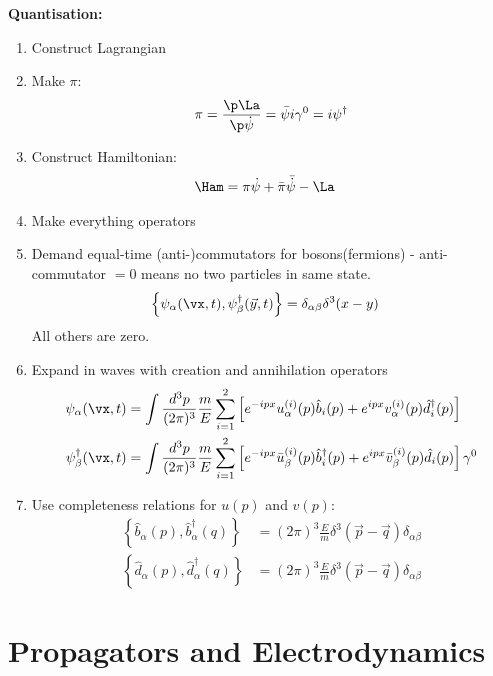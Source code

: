 \documentclass[a4paper, 11pt, normalem]{report}
\begin{document}
\newpage
\textbf{Quantisation:}
\begin{enumerate}
    \item Construct Lagrangian
    \item Make $\pi$:
        \begin{equation}
            \pi = \frac{\p\La}{\p\dot{\psi}} = \bar{\psi}i\gamma^0 = i\psi^\dagger
        \end{equation}
    \item Construct Hamiltonian:
        \begin{align}
            \Ham &= \pi\dot{\psi} + \bar{\pi}\bar{\dot{\psi}} - \La
        \end{align}
    \item Make everything operators
    \item Demand equal-time (anti-)commutators for bosons(fermions) - anti-commutator $= 0$ means no two particles in same state.
        \begin{align}
            \left\{\psi_\alpha(\vx,t),\psi^\dagger_\beta(\vec{y},t)\right\} &= \delta_{\alpha\beta}\delta^3(x-y)
        \end{align}
        All others are zero.
    \item Expand in waves with creation and annihilation operators
        \begin{align}
            \psi_\alpha(\vx,t) &= \int \frac{d^3p}{(2\pi)^3} \frac{m}{E} \sum_{i=1}^2\left[e^{-ipx}u_\alpha^{(i)}(p)\hat{b}_i(p) + e^{ipx}v_\alpha^{(i)}(p)\hat{d}^\dagger_i(p) \right]\\
            \psi_\beta^\dagger(\vx,t) &= \int \frac{d^3p}{(2\pi)^3} \frac{m}{E} \sum_{i=1}^2\left[e^{-ipx}\bar{u}_\beta^{(i)}(p)\hat{b}^\dagger_i(p) + e^{ipx}\bar{v}_\beta^{(i)}(p)\hat{d}_i(p) \right]\gamma^0
        \end{align}
    \item Use completeness relations for $u(p)$ and $v(p)$:
        \begin{align}
            \left\{\hat{b}_\alpha(p),\hat{b}_\alpha^\dagger(q)\right\} &= (2\pi)^3\frac{E}{m}\delta^3(\vec{p}-\vec{q})\delta_{\alpha\beta} \\
            \left\{\hat{d}_\alpha(p),\hat{d}_\alpha^\dagger(q)\right\} &= (2\pi)^3\frac{E}{m}\delta^3(\vec{p}-\vec{q})\delta_{\alpha\beta}
        \end{align}
\end{enumerate}

\chapter{Propagators and Electrodynamics}
\end{document}
